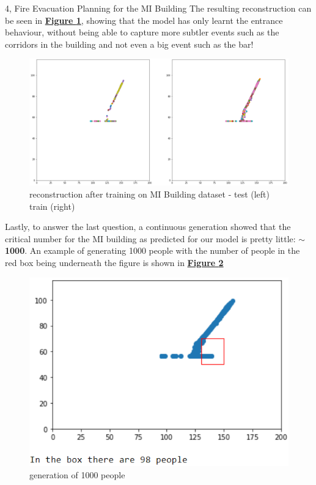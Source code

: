 \documentclass[10pt,a4paper]{article}
\begin{document}
\begin{task}{4, Fire Evacuation Planning for the MI Building}
The resulting reconstruction can be seen in \textbf{\hyperref[fig:mi-rec]{Figure \ref{fig:mi-rec}}}, showing that the model has only learnt the entrance behaviour, without being able to capture more subtler events such as the corridors in the building and not even a big event such as the bar! 

\begin{figure}[H]
    \centering
    \includegraphics[scale=0.4]{images/test-rec-mi.png}
    \caption{reconstruction after training on MI Building dataset - test (left) train (right)}
    \label{fig:mi-rec}
\end{figure}

Lastly, to answer the last question, a continuous generation showed that the critical number for the MI building as predicted for our model is pretty little: \textbf{$\sim$1000}. An example of generating 1000 people with the number of people in the red box being underneath the figure is shown in \textbf{\hyperref[fig:mi-gen]{Figure \ref{fig:mi-gen}}}
\begin{figure}[H]
    \centering
    \includegraphics[scale=0.8]{images/generated-mi.png}
    \caption{generation of 1000 people}
    \label{fig:mi-gen}
\end{figure}

\end{task}
\end{document}

